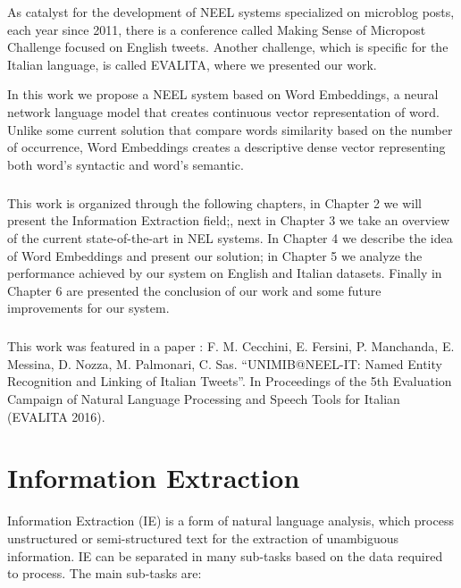 As catalyst for the development of NEEL systems specialized on microblog posts, each year since 2011, there is a conference called Making Sense of Micropost Challenge focused on English tweets. Another challenge, which is specific for the Italian language, is called EVALITA, where we presented our work.

In this work we propose a NEEL system based on Word Embeddings, a neural network language model that creates continuous vector representation of word. Unlike some current solution that compare words similarity based on the number of occurrence, Word Embeddings creates a descriptive dense vector representing both word's syntactic and word's semantic. 

\paragraph{}
This work is organized through the following chapters, in Chapter 2 we will present the Information Extraction field;, next in Chapter 3 we take an overview of the current state-of-the-art in NEL systems. In Chapter 4 we describe the idea of Word Embeddings and present our solution; in Chapter 5 we analyze the performance achieved by our system on English and Italian datasets. Finally in Chapter 6 are presented the conclusion of our work and some future improvements for our system.

\paragraph{}
This work was featured in a paper \cite{cecchiniunimib}: F. M. Cecchini, E. Fersini, P. Manchanda, E. Messina, D. Nozza, M. Palmonari, C. Sas. “UNIMIB@NEEL-IT: Named Entity Recognition and Linking of Italian Tweets”. In Proceedings of the 5th Evaluation Campaign of Natural Language Processing and Speech Tools for Italian (EVALITA 2016). 



\chapter{Information Extraction}
Information Extraction (IE) is a form of natural language analysis, which process unstructured or semi-structured text for the extraction of unambiguous information. IE can be separated in many sub-tasks based on the data required to process. The main sub-tasks are:

